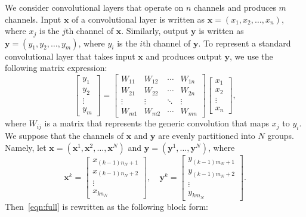 \documentclass[10pt,a4paper]{amsart}
\numberwithin{equation}{section}
\theoremstyle{remark}
\newcommand\bx{\mathbf{x}}
\newcommand\by{\mathbf{y}}
\begin{document}
We consider convolutional layers that operate on $n$ channels and produces $m$ channels.
Input $\bx$ of a convolutional layer is written as $\bx = (x_{1}, x_{2}, \dots, x_{n})$, where $x_{j}$ is the $j$th channel of $\bx$.
Similarly, output $\by$ is written as $\by = (y_{1}, y_{2}, \dots, y_{m})$, where $y_{i}$ is the $i$th channel of $\by$.
To represent a standard convolutional layer that takes input $\bx$ and produces output $\by$, we use the following matrix expression:
\begin{equation}
\label{eqn:full}
\begin{bmatrix} y_{1} \\ y_{2} \\ \vdots \\ y_{m} \end{bmatrix}
= \begin{bmatrix} W_{11} & W_{12} & \cdots & W_{1n} \\
    W_{21} & W_{22} & \cdots & W_{2n} \\
    \vdots & \vdots & \ddots & \vdots \\
    W_{m1} & W_{m2} & \cdots & W_{mn} \end{bmatrix}
\begin{bmatrix} x_{1} \\ x_{2} \\ \vdots \\ x_{n} \end{bmatrix},
\end{equation}
where $W_{ij}$ is a matrix that represents the generic convolution that maps $x_{j}$ to $y_{i}$.
We suppose that the channels of $\bx$ and $\by$ are evenly partitioned into $N$ groups.
Namely, let $\bx = (\bx^1, \bx^2, \dots, \bx^N)$ and $\by = (\by^1, \dots, \by^N)$, where
\begin{equation*}
    \bx^k = \begin{bmatrix} x_{(k-1)n_N + 1} \\ x_{(k-1)n_N + 2} \\ \vdots \\ x_{k n_N} \end{bmatrix}, \quad
    \by^k = \begin{bmatrix} y_{(k-1)m_N + 1} \\ y_{(k-1)m_N + 2} \\ \vdots \\ y_{k m_N} \end{bmatrix}.
\end{equation*}
Then~\eqref{eqn:full} is rewritten as the following block form:
\end{document}
